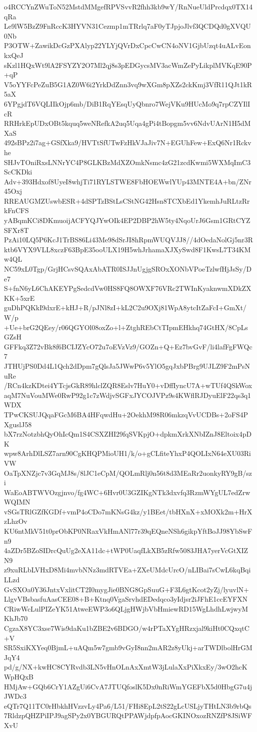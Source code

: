 o4RCCYnZWuToN52MstdMMgefRPVSvvR2fhh3kb9wY/RnNueUldPrcdqx0TX14qRa
Le9lW5BzZ9FnRccK3HYVN31Cezmp1mTRrlq7aF0yTJpjoJlvf3QCDQd0gXVQU0Nb
P3OTW+ZawikDcGzPXAlyp22YLYjQVrDxCpcCwCN4oNV1GjbUzqt4uALvEonkxQeJ
sKzl1HQxWt9lA2FSYZY2O7Ml2qj8s3pEDGycsMV3acWmZePyLikplMVKqE90P+qP
V5oYYFcPeZuB5G1AZ0W6i2YrkDdZnn3vq9wXGm8pXZs2ckKmj3VfR11QJt1kR5aX
6YPgjdT6VQLIIkOjp6mb/DiB1RqYEsqUyQbnro7WejVKu9HUcMo9q7rpCZYIlIcR
RRHrkEpUDxOBt5kquq5weNRefkA2uq5Uqa4gPi4tBopgm5vv6NdvUArN1H5dMXaS
492sBPz2i7ag+GSfXka9/HVTtSfUTwFzHkVJaJiv7N+EGUhFew+ExQ6Nr1Rckvhe
SHJvTOniRxsLNNrYC4P8GLKBzMdXZOmkNsmc4zG21zcdKwmi5WXMqImC3ScCKDki
Adv+393Hdxof8UyeI8whjTi71RYLSTWE8FbHOEWwlYUp43MNTE4A+bn/ZNr45Oxj
RREAUGMZUswbESR+4dSPTzBStLsCStNG42Hsn8TCXbEd1YkemhJuRLtzRrkFnCFS
yABqmKCi8DKmuoijACFYQJYwOIk4EP2DBP2hW5ty4NqoUrJ6Gsm1GRtCYZSFXr8T
PzAi10LQ5P6KcJ1TrBS86Li43Me98dSrJI8hRpmWUQVJJ8//4dOedaNolGj5nr3R
ktb6VYX9VLL8xczF63BpE35ooULX19H5whJrhamaXJXySwd8F1KwsL7T34KMw4QL
NC59xL0Tgp/GrjHCsvSQAxAbATR0ISJJnUgjgSROxXONbVPoeTzlwfHjJsSy/De7
S+fnN6yL6ChAKEYPgSedcdVw0HS8FQ8OWXF76VRc2TWInKyaknwmXDkZXKK+5xrE
guDhPQKkI9dxrE+kHJ+R/pJNl8zI+kL2C2u9OXj81WpA8ytcItZaFcI+GmXt/W/p
+Ue+brG2QEey/r06QGYOl08oxZo+l+ZtghREbCtTIpmEHkhq74GtHX/8CpLsGZsH
GFFkq3Z72vBk8f6BCIJZYcO72u7oEVzVz9/GOZn+Q+Ez7bvGvF/li4lafFgFWQc7
JTHUjPS0Dd4L1Qch2dDpm7gQlsJa5JWwP6v5YlO5gqJxbPBrg9UJLZ9F2mPsNuRe
/RCn4kzKDtei4YTcjsGkR89hlclZQR8Eslv7HuY0+vDffIyncU7A+wTUf4QSkWox
aqM7NuVouMWe0RwP92g1c7zWdjvSGFxJYCOJVPz9s4KWflRJDyuElF22qs3q1WDX
TPwCKSUJQqaFGcM6BA4HFqwdHu+2OekhM98R06mkzqVvUCDBs+2oFS4PXguslJ58
bX7rzNotzbhQyOhIcQm1S4CSXZHI29fqSVKpjO+dpkmXrkXNbIZnJ8Eltoix4pDK
wpw8ArhDlLSZ7arn90CgKHQPMioUH1/k/o+gCLfiteYhxP4QOLIxN64eXU03RiVW
OaTpXNZjc7v3GqMJ8s/8lJC1eCpM/QOLmRlj0n56t8d3MEaRr2uonkyRY9gB/szi
WaEoABTWVOzgjnvo/fg4WC+6Hvr0U3GZIKgNTk3dxvfq3RzmWYgUL7edZrwWQIMN
vSGsTRlGZfKGDf+vmP4oCDo7mKNsG4kz/y1BEet/tbHXnX+xMOXk2m+HrXzLhzOv
KU6ntMkV51t0prObKP0NRaxVkHmANl77r39qEQneNSh6gikpYftBoJJ98YbSwFn9
4aZDr5BZoSIDrcQuUg2eXA11dc+tWP0UaqfLkXB5zRfw5083JHA7yerVcGtXIZN9
z9xuRLbLVHxD8Mi4mvbNNz3mdRTVEa+ZXeUMdcUrcO/nLIBai7sCwL6kqBqiLLzd
GvSXOa0Y36JntxVxlitCT2I0mygJie0BNG8GpSuuG+F3L6gtKcot2yZj/lyuvlN+
LlgvVBsbasfuAasCEE08+B+Ktnq0VgaSrvhdEDedqco3yIdjsr2iJFhE1ccEYFXN
CRiwWcLulPIZeYK51AtweEWP3o6QLjgHWjbVbHmiewRD15WgLhdhLwjwyMKhJb70
CgzaX8YC3xse7Wis9daKu1bZBE2v6BDGO/w4rPTaXYgHRzxjal9kiHt0CQxqtC+V
SR5SxiKXYeq0BjmL+uAQm5w7gmb9vGyI8nn2mAR2z8yUkj+arTWDlbolHrGMJqY4
pd/g/NX+kwHC8CYRvdb3LN5vHnOLnAxXmtW3jLulaXxPiXkxEy/3wO2hcKWpHQxB
HMjAw+GQb6CrY1AZgUi6CvA7JTUQfoslK5Dx0nRiWmYGEFbX5d0HbgG7u4jJWDc3
eQTr7Q11TC0rHbkhHVzzvLy4Pa6/L51/FHi8EpL2tS22gLcUSLjyTHtLN3b9rbQs
7RldzpQHZPiIPJ9agSPy2x0YBGURQtPPAWjdpfpAocGKINOxozRNZfP8JSiWFXvU
